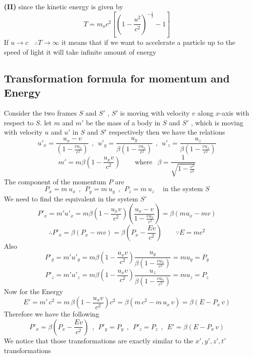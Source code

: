 \textbf{(II)} since the kinetic energy is given by
\[
T = m_o c^2 \left[{\left(1- \frac{u^2}{c^2}\right)}^{-\frac{1}{2}}-1\right]
\]
If $u \to c  \ \ \ \  \therefore T \to \infty $ it means that if we want to accelerate a particle up to the speed of light it will take infinite amount of energy
\subsection{Transformation formula for momentum and Energy}
Consider the two frames $S$ and $S'$ , $S'$ is moving with velocity $v$ along $x$-axis with respect to $S$. let $m$ and $m'$ be the mass of a body in $S$ and $S'$ , which is moving with velocity $u$ and $u'$ in $S$ and $S'$ respectively
then we have the relations
\[
u'_x = \frac{u_x - v}{\left(1 - \frac{vu_x}{c^2}\right)}
\ \ , \ \ 
u'_y = \frac{u_y}{\beta\left(1 - \frac{vu_x}{c^2}\right)}
\ \ , \ \ 
u'_z = \frac{u_z}{\beta\left(1 - \frac{vu_x}{c^2}\right)}
\]
\[ 
    m' = m \beta\left(1-\frac{u_x v}{c^2}\right) \ \ \ \ \ \ \ \ \text{ where } \ \ \beta = \frac{1}{\sqrt{1-\frac{v^2}{c^2}}}
\]
The component of the momentum $P$ are 
\[
P_x = m \ u_x
\ \ , \ \    
P_y = m \ u_y
\ \ , \ \  
P_z = m \ u_z
\ \ \ \  
\text{ in the system } S
\]
We need to find the equivalent in the system $S'$
\[
P'_x = m'u'_x = m \beta\left(1-\frac{u_x v}{c^2}\right) \left(\frac{u_x - v}{1 - \frac{vu_x}{c^2}}\right) = \beta\left(m u_x - m v\right)
\]
\[
\therefore     P'_x = \beta\left(P_x - m v\right) = \beta\left(P_x - \frac{Ev}{c^2}\right)  \ \ \ \ \ \ \ \ \ \because E=m c^2
\]
Also
\[
P'_y = m'u'_y = m \beta\left(1-\frac{u_x v}{c^2}\right) \frac{u_y}{\beta\left(1 - \frac{vu_x}{c^2}\right)} = m u_y = P_y
\]
\[
P'_z = m'u'_z = m \beta\left(1-\frac{u_x v}{c^2}\right) \frac{u_z}{\beta\left(1 - \frac{vu_x}{c^2}\right)} = m u_z = P_z
\]
Now for the Energy
\[
E' = m'\,c^2 = m\,\beta\left(1-\frac{u_x v}{c^2}\right) c^2 = \beta\left(m\,c^2 - m\, u_x\, v\right) = \beta\left(E - P_x\, v\right)
\]
Therefore we have the following
\[
    P'_x = \beta\left(P_x - \frac{Ev}{c^2}\right)
    \ \ , \ \  
    P'_y = P_y
    \ \ , \ \  
    P'_z = P_z
    \ \ , \ \ 
    E' =\beta\left(E - P_x\, v\right)
\]
We notice that those transformations are exactly similar to the $x',y',z',t'$ transformations
\newpage
